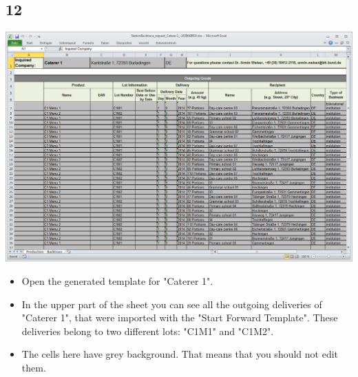 \documentclass{beamer}
\begin{document}
\subsection{12}
\begin{frame}
	\begin{center}
  		\includegraphics[height=0.55\textheight]{12.png}
	\end{center}
	\begin{itemize}
		\item Open the generated template for "Caterer 1".
		\item In the upper part of the sheet you can see all the outgoing deliveries of "Caterer 1", that were imported with the "Start Forward Template". These deliveries belong to two different lots: "C1M1" and "C1M2".
		\item The cells here have grey background. That means that you should not edit them.
	\end{itemize}
\end{frame}
\end{document}
